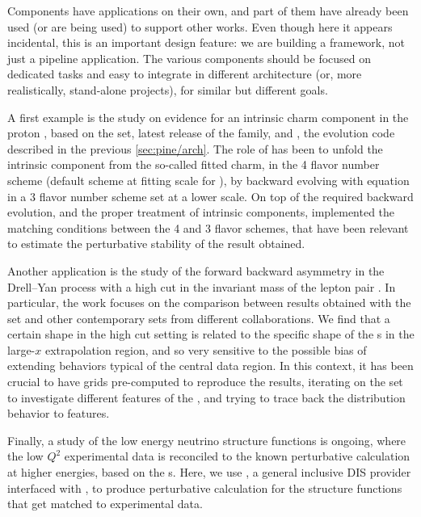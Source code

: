 
Components have applications on their own, and part of them have already been
used (or are being used) to support other works.
Even though here it appears incidental, this is an important design feature: we
are building a framework, not just a pipeline application. The
various components should be focused on dedicated tasks and easy to integrate
in different architecture (or, more realistically, stand-alone projects), for
similar but different goals.

A first example is the study on evidence
for an intrinsic charm component in the proton \cite{Ball:2022qks}, based on
the  \pdf set, latest release of the \nnpdf family, and \eko
\cite{Candido:2022tld}, the evolution code described in the previous
\cref{sec:pine/arch}.
The role of \eko has been to unfold the intrinsic component from the so-called
fitted charm, in the 4 flavor number scheme (default scheme at fitting scale
for \nnpdf), by backward evolving with \dglap equation in a 3 flavor number
scheme \pdf set at a lower scale.
On top of the required backward evolution, and the proper treatment of
intrinsic components,
\eko implemented the \nnnlo matching conditions
between the 4 and 3 flavor schemes, that have been relevant to estimate the
perturbative stability of the result obtained.

Another application is the study of the forward backward asymmetry in the
Drell--Yan process with a high cut in the invariant mass of the
lepton pair \cite{Ball:2022qtp}.
In particular, the work focuses on the comparison between results obtained with
the  \pdf set and other contemporary \pdf sets from different
collaborations. We find that a certain shape in the high cut setting is
related to the specific shape of the \pdf{}s in the large-$x$ extrapolation
region, and so very sensitive to the possible bias of extending behaviors
typical of the central data region.
In this context, it has been crucial to have \pineappl \cite{Carrazza:2020gss}
\cite{christopher_schwan_2022_7145377} grids pre-computed to reproduce the
results, iterating on the \pdf set to investigate different features of the
\pdf, and trying to trace back the distribution behavior to \pdf features.

Finally, a study of the low energy neutrino structure functions is ongoing,
where the low $Q^2$ experimental data is reconciled to the known
perturbative calculation at higher energies, based on the \pdf{}s.
Here, we use \yadism, a general inclusive DIS provider
interfaced with \pineappl, to produce perturbative \qcd calculation for the
structure functions that get matched to experimental data.

